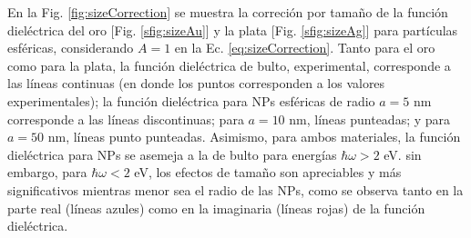%
%
%	
%	

En la Fig.  \ref{fig:sizeCorrection} se muestra la correción por tamaño de la función dieléctrica del oro [Fig. \ref{sfig:sizeAu}] y la plata [Fig.  \ref{sfig:sizeAg}] para partículas esféricas, considerando $A=1$ en la Ec. \eqref{eq:sizeCorrection}. Tanto para el oro como para la plata, la función dieléctrica de bulto, experimental, corresponde a las líneas continuas (en donde los puntos corresponden a los valores experimentales); la función dieléctrica para NPs esféricas de radio $a=5$ nm corresponde a las líneas discontinuas; para $a=10$ nm, líneas punteadas; y para $a=50$ nm, líneas punto punteadas. Asimismo, para ambos materiales, la función dieléctrica para NPs se asemeja a la de bulto para energías $\hbar\omega>2$ eV. sin embargo, para $\hbar\omega<2$ eV, los efectos de tamaño son apreciables y más significativos mientras menor sea el radio de las NPs, como se observa tanto  en la parte real (líneas azules) como en la imaginaria (líneas rojas) de la función dieléctrica.

